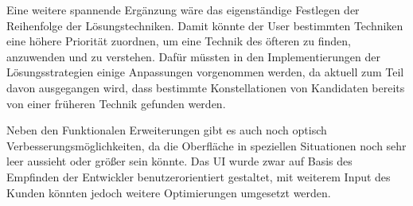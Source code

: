 Eine weitere spannende Ergänzung wäre das eigenständige Festlegen der Reihenfolge der Lösungstechniken. Damit könnte der User bestimmten Techniken eine höhere Priorität zuordnen, um eine Technik des öfteren zu finden, anzuwenden und zu verstehen. Dafür müssten in den Implementierungen der Lösungsstrategien einige Anpassungen vorgenommen werden, da aktuell zum Teil davon ausgegangen wird, dass bestimmte Konstellationen von Kandidaten bereits von einer früheren Technik gefunden werden.

Neben den Funktionalen Erweiterungen gibt es auch noch optisch Verbesserungsmöglichkeiten, da die Oberfläche in speziellen Situationen noch sehr leer aussieht oder größer sein könnte. Das \ac{UI} wurde zwar auf Basis des Empfinden der Entwickler benutzerorientiert gestaltet, mit weiterem Input des Kunden könnten jedoch weitere Optimierungen umgesetzt werden. 

